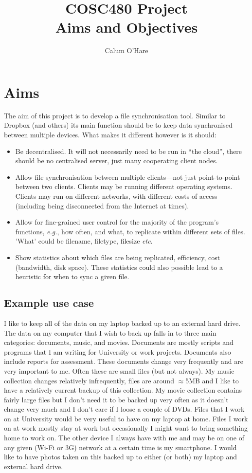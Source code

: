 \documentclass[12pt]{article}
\title{COSC480 Project \\ Aims and Objectives}
\author{Calum O'Hare}
\date{}
\begin{document}
\maketitle

\section{Aims}
The aim of this project is to develop a file synchronisation tool.
Similar to  Dropbox (and others) its main function should be to
keep data synchronised between multiple devices.
What makes it different however is it should:
\begin{itemize}
\item Be decentralised. It will not necessarily need to be run in ``the cloud'', there should be
no centralised server, just many cooperating client nodes.

\item Allow file synchronisation between multiple clients---not just point-to-point between two clients. Clients may be
running different operating systems. Clients may run on different networks, with different costs of access (including being disconnected from the Internet at times).

\item Allow for fine-grained user control for the majority of the program's
functions, \emph{e.g.}, how often, and what, to replicate within different sets of files. 'What' could be filename, filetype, filesize \emph{etc}.

\item Show statistics about which files are being replicated, efficiency,
cost (bandwidth, disk space). These statistics could also possible lead
to a heuristic for when to sync a given file.
\end{itemize}
\subsection*{Example use case}

I like to keep all of the data on my laptop backed up to an
external hard drive. The data on my computer that I wish
to back up falls in to three main categories: documents, music, and movies.
Documents are mostly scripts and programs that I am writing for
University or work projects. Documents also include reports for
assessment. These documents change very frequently and are very important
to me. Often these are small files (but not always). My music collection
changes relatively infrequently, files are around $\approx$5MB and I like to
have a relatively current backup of this collection. My movie collection
contains fairly large files but I don't need it to be backed up very often
as it doesn't change very much and I don't care if I loose a couple of
DVDs. Files that I work on at University would be very useful to have
on my laptop at home. Files I work on at work mostly stay at work
but occasionally I might want to bring something home to work on.
The other device I always have with me and may be on one of any given
(Wi-Fi or 3G) network at a certain time is my smartphone. I would like
to have photos taken on this backed up to either (or both) my laptop and
external hard drive. 
\end{document}
